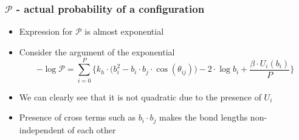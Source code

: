 \documentclass[xcolor=svgnames]{beamer}
\begin{document}
    \fi
	\begin{frame}
	\frametitle{$\mathcal{P}$ - actual probability of a configuration}
	\begin{itemize}
	\justifying
	\item Expression for $\mathcal{P}$ is almost exponential
	\item Consider the argument of the exponential
	\begin{equation*}
	- \log \mathcal{P} = \displaystyle\sum\limits_{i=0}^P \Bigg\{ k_h \cdot \Big( b_i^2 - b_i \cdot b_j \cdot \cos (\theta_{ij}) \Big) - 2 \cdot \log b_i + \frac{ \beta \cdot U_i (b_i)}{P} \Bigg\}
	\end{equation*}
	\item We can clearly see that it is not quadratic due to the presence of $U_i$
	\item Presence of cross terms such as $b_i \cdot b_j$ makes the bond lengths non-independent of each other
	\end{itemize}
	\end{frame}
	

\end{document}
